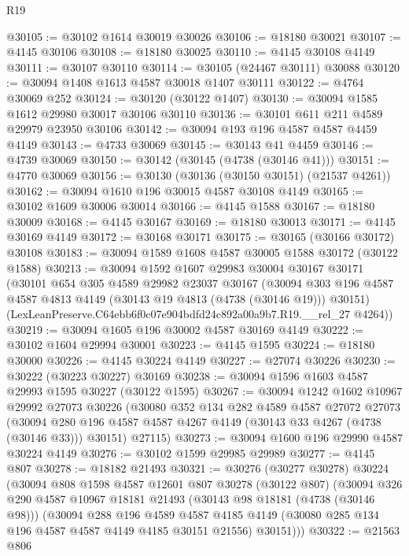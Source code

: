 \begin{lexlean}{R19}
\begin{coremodule}
@30105 := @30102 @1614 @30019 @30026
@30106 := @18180 @30021
@30107 := @4145 @30106
@30108 := @18180 @30025
@30110 := @4145 @30108 @4149
@30111 := @30107 @30110
@30114 := @30105 (@24467 @30111) @30088
@30120 := @30094 @1408 @1613 @4587 @30018 @1407 @30111
@30122 := @4764 @30069 @252
@30124 := @30120 (@30122 @1407)
@30130 := @30094 @1585 @1612 @29980 @30017 @30106 @30110
@30136 := @30101 @611 @211 @4589 @29979 @23950 @30106
@30142 := @30094 @193 @196 @4587 @4587 @4459 @4149
@30143 := @4733 @30069
@30145 := @30143 @41 @4459
@30146 := @4739 @30069
@30150 := @30142 (@30145 (@4738 (@30146 @41)))
@30151 := @4770 @30069
@30156 := @30130 (@30136 (@30150 @30151) (@21537 @4261))
@30162 := @30094 @1610 @196 @30015 @4587 @30108 @4149
@30165 := @30102 @1609 @30006 @30014
@30166 := @4145 @1588
@30167 := @18180 @30009
@30168 := @4145 @30167
@30169 := @18180 @30013
@30171 := @4145 @30169 @4149
@30172 := @30168 @30171
@30175 := @30165 (@30166 @30172) @30108
@30183 := @30094 @1589 @1608 @4587 @30005 @1588 @30172 (@30122 @1588)
@30213 := @30094
    @1592
    @1607
    @29983
    @30004
    @30167
    @30171
    (@30101
      @654
      @305
      @4589
      @29982
      @23037
      @30167
      (@30094 @303 @196 @4587 @4587 @4813 @4149 (@30143 @19 @4813 (@4738 (@30146 @19))) @30151)
      (LexLeanPreserve.C64ebb6f0c07e904bdfd24c892a00a9b7.R19.__rel_27 @4264))
@30219 := @30094 @1605 @196 @30002 @4587 @30169 @4149
@30222 := @30102 @1604 @29994 @30001
@30223 := @4145 @1595
@30224 := @18180 @30000
@30226 := @4145 @30224 @4149
@30227 := @27074 @30226
@30230 := @30222 (@30223 @30227) @30169
@30238 := @30094 @1596 @1603 @4587 @29993 @1595 @30227 (@30122 @1595)
@30267 := @30094
    @1242
    @1602
    @10967
    @29992
    @27073
    @30226
    (@30080
      @352
      @134
      @282
      @4589
      @4587
      @27072
      @27073
      (@30094 @280 @196 @4587 @4587 @4267 @4149 (@30143 @33 @4267 (@4738 (@30146 @33))) @30151)
      @27115)
@30273 := @30094 @1600 @196 @29990 @4587 @30224 @4149
@30276 := @30102 @1599 @29985 @29989
@30277 := @4145 @807
@30278 := @18182 @21493
@30321 := @30276
    (@30277 @30278)
    @30224
    (@30094
      @808
      @1598
      @4587
      @12601
      @807
      @30278
      (@30122 @807)
      (@30094
        @326
        @290
        @4587
        @10967
        @18181
        @21493
        (@30143 @98 @18181 (@4738 (@30146 @98)))
        (@30094
          @288
          @196
          @4589
          @4587
          @4185
          @4149
          (@30080 @285 @134 @196 @4587 @4587 @4149 @4185 @30151 @21556)
          @30151)))
@30322 := @21563 @806

\end{coremodule}
\end{lexlean}
